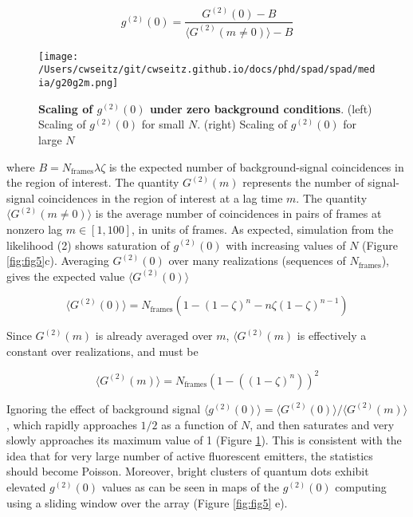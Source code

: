 \begin{equation}
g^{(2)}(0) = \frac{G^{(2)}(0)-B}{\langle G^{(2)}(m\neq 0)\rangle -B}
\end{equation}

\begin{figure}[t]
\centering
\texttt{[image: /Users/cwseitz/git/cwseitz.github.io/docs/phd/spad/spad/media/g20g2m.png]}
\caption{\textbf{Scaling of $g^{(2)}(0)$ under zero background conditions}. (left) Scaling of $g^{(2)}(0)$ for small $N$. (right) Scaling of $g^{(2)}(0)$ for large $N$}
\label{fig:fig8}
\end{figure}   

where $B = N_{\mathrm{frames}}\lambda\zeta$ is the expected number of background-signal coincidences in the region of interest. The quantity $G^{(2)}(m)$ represents the number of signal-signal coincidences in the region of interest at a lag time $m$. The quantity $\langle G^{(2)}(m\neq 0)\rangle$ is the average number of coincidences in pairs of frames at nonzero lag $m \in [1,100]$, in units of frames. As expected, simulation from the likelihood (2) shows saturation of $g^{(2)}(0)$  with increasing values of $N$ (Figure \ref{fig:fig5}c). Averaging $G^{(2)}(0)$ over many realizations (sequences of $N_{\mathrm{frames}}$), gives the expected value $\langle G^{(2)}(0)\rangle $

\begin{equation}
\langle G^{(2)}(0)\rangle = N_{\mathrm{frames}}(1 - (1-\zeta)^n - n\zeta (1-\zeta)^{n-1})
\end{equation}

Since $G^{(2)}(m)$ is already averaged over $m$, $\langle G^{(2)}(m) $ is effectively a constant over realizations, and must be

\begin{equation}
\langle G^{(2)}(m)\rangle =  N_{\mathrm{frames}} \left(1 - \left((1-\zeta)^n\right)\right)^2
\end{equation}

Ignoring the effect of background signal $\langle g^{(2)}(0)\rangle =\langle G^{(2)}(0)\rangle/\langle G^{(2)}(m)\rangle$, which rapidly approaches $1/2$ as a function of $N$, and then saturates and very slowly approaches its maximum value of 1 (Figure \ref{fig:fig8}). This is consistent with the idea that for very large number of active fluorescent emitters, the statistics should become Poisson. Moreover, bright clusters of quantum dots exhibit elevated $g^{(2)}(0)$ values as can be seen in maps of the $g^{(2)}(0)$ computing using a sliding window over the array (Figure \ref{fig:fig5} e).

